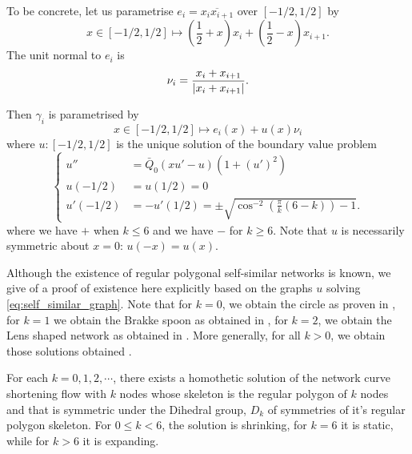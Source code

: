 \documentclass[11pt]{amsart}
\begin{document}
To be concrete, let us parametrise \(e_i = \overline{x_i x_{i+1}}\) over \([-1/2, 1/2]\) by
\[
x \in [-1/2, 1/2] \mapsto \left(\frac{1}{2} + x\right) x_i + \left(\frac{1}{2} - x\right) x_{i+1}.
\]
The unit normal to \(e_i\) is
\[
\nu_i = \frac{x_i + x_{i+1}}{\left|x_i + x_{i+1}\right|}.
\]

Then \(\gamma_i\) is parametrised by
\[
x \in [-1/2, 1/2] \mapsto e_i(x) + u(x) \nu_i
\]
where \(u : [-1/2, 1/2]\) is the unique solution of the boundary value problem
\begin{equation}
\label{eq:self_similar_graph}
\begin{cases}
u'' &= \bar{Q}_0 (xu' - u)(1 + (u')^2) \\
u(-1/2) &= u(1/2) = 0 \\
u'(-1/2) &= -u'(1/2) = \pm \sqrt{\cos^{-2} \left(\frac{\pi}{k}(6 - k)\right) - 1}.
\end{cases}
\end{equation}
where we have \(+\) when \(k \leq 6\) and we have \(-\) for \(k \geq 6\). Note that \(u\) is necessarily symmetric about \(x = 0\): \(u(-x) = u(x)\).

Although the existence of regular polygonal self-similar networks is known, we give of a proof of existence here explicitly based on the graphs \(u\) solving \eqref{eq:self_similar_graph}. Note that for \(k = 0\), we obtain the circle as proven in \cite{MR845704}, for \(k = 1\) we obtain the Brakke spoon as obtained in \cite{}, for \(k = 2\), we obtain the Lens shaped network as obtained in \cite{MR2763716}. More generally, for all \(k > 0\), we obtain those solutions obtained \cite{MR2340176}.

\begin{lemma}
For each \(k = 0, 1, 2, \cdots\), there exists a homothetic solution of the network curve shortening flow with \(k\) nodes whose skeleton is the regular polygon of \(k\) nodes and that is symmetric under the Dihedral group, $D_k$ of symmetries of it's regular polygon skeleton. For \(0 \leq k < 6\), the solution is shrinking, for \(k = 6\) it is static, while for \(k > 6\) it is expanding.
\end{lemma}
\end{document}
